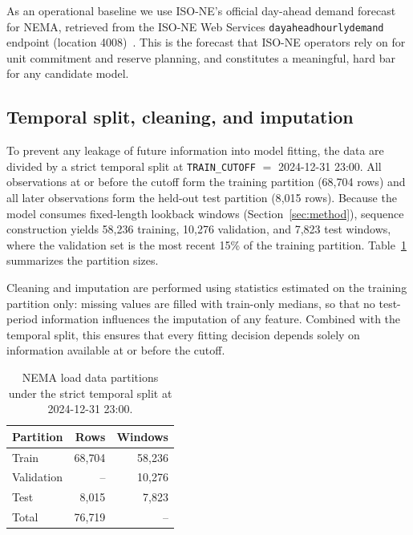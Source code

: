 As an operational baseline we use ISO-NE's official day-ahead demand forecast for
NEMA, retrieved from the ISO-NE Web Services \texttt{dayaheadhourlydemand}
endpoint (location 4008)~\cite{isone}. This is the forecast that ISO-NE operators
rely on for unit commitment and reserve planning, and constitutes a meaningful,
hard bar for any candidate model.

\subsection{Temporal split, cleaning, and imputation}

To prevent any leakage of future information into model fitting, the data are
divided by a strict temporal split at \texttt{TRAIN\_CUTOFF}
$=$ 2024-12-31 23:00. All observations at or before the cutoff form the training
partition (68{,}704 rows) and all later observations form the held-out test
partition (8{,}015 rows). Because the model consumes fixed-length lookback
windows (Section~\ref{sec:method}), sequence construction yields 58{,}236
training, 10{,}276 validation, and 7{,}823 test windows, where the validation
set is the most recent 15\% of the training partition. Table~\ref{tab:data}
summarizes the partition sizes.

Cleaning and imputation are performed using statistics estimated on the training
partition only: missing values are filled with train-only medians, so that no
test-period information influences the imputation of any feature. Combined with
the temporal split, this ensures that every fitting decision depends solely on
information available at or before the cutoff.

\begin{table}[t]
\centering
\caption{NEMA load data partitions under the strict temporal split at
2024-12-31 23:00.}
\label{tab:data}
\begin{tabular}{lrr}
\toprule
Partition & Rows & Windows \\
\midrule
Train      & 68{,}704 & 58{,}236 \\
Validation & --       & 10{,}276 \\
Test       & 8{,}015  & 7{,}823 \\
\midrule
Total      & 76{,}719 & --       \\
\bottomrule
\end{tabular}
\end{table}
